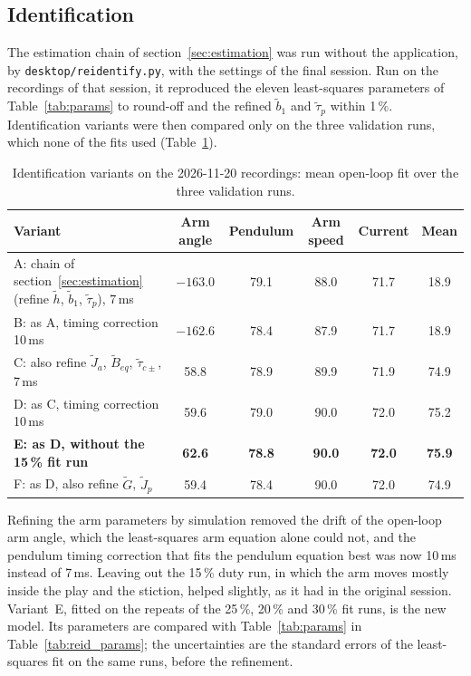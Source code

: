 \documentclass[a4paper,11pt]{article}
\begin{document}
\subsection{Identification}
\label{sec:reid_ident}
The estimation chain of section~\ref{sec:estimation} was run without the application, by \nolinkurl{desktop/reidentify.py}, with the settings of the final session. Run on the recordings of that session, it reproduced the eleven least-squares parameters of Table~\ref{tab:params} to round-off and the refined $\tilde b_1$ and $\tilde\tau_p$ within 1\,\%. Identification variants were then compared only on the three validation runs, which none of the fits used (Table~\ref{tab:reid_variants}).

\begin{table}[h]
\centering
\caption{Identification variants on the 2026-11-20 recordings: mean open-loop fit over the three validation runs.}
\label{tab:reid_variants}
\small
\begin{tabular}{@{}lccccc@{}}
\toprule
Variant & Arm angle & Pendulum & Arm speed & Current & Mean \\
\midrule
A: chain of section~\ref{sec:estimation} (refine $\tilde h$, $\tilde b_1$, $\tilde\tau_p$), 7\,ms & $-163.0$ & 79.1 & 88.0 & 71.7 & 18.9 \\
B: as A, timing correction 10\,ms & $-162.6$ & 78.4 & 87.9 & 71.7 & 18.9 \\
C: also refine $\tilde J_a$, $\tilde B_{eq}$, $\tilde\tau_{c\pm}$, 7\,ms & 58.8 & 78.9 & 89.9 & 71.9 & 74.9 \\
D: as C, timing correction 10\,ms & 59.6 & 79.0 & 90.0 & 72.0 & 75.2 \\
\textbf{E: as D, without the 15\,\% fit run} & \textbf{62.6} & \textbf{78.8} & \textbf{90.0} & \textbf{72.0} & \textbf{75.9} \\
F: as D, also refine $\tilde G$, $\tilde J_p$ & 59.4 & 78.4 & 90.0 & 72.0 & 74.9 \\
\bottomrule
\end{tabular}
\end{table}

Refining the arm parameters by simulation removed the drift of the open-loop arm angle, which the least-squares arm equation alone could not, and the pendulum timing correction that fits the pendulum equation best was now 10\,ms instead of 7\,ms. Leaving out the 15\,\% duty run, in which the arm moves mostly inside the play and the stiction, helped slightly, as it had in the original session. Variant~E, fitted on the repeats of the 25\,\%, 20\,\% and 30\,\% fit runs, is the new model. Its parameters are compared with Table~\ref{tab:params} in Table~\ref{tab:reid_params}; the uncertainties are the standard errors of the least-squares fit on the same runs, before the refinement.
\end{document}
